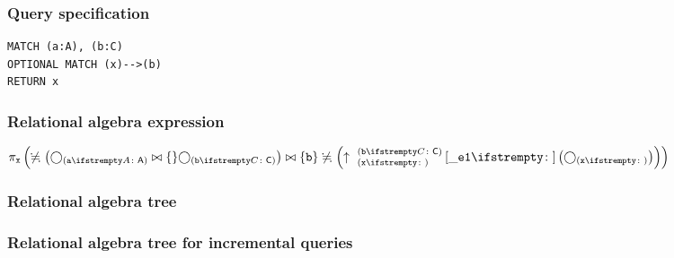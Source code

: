 \subsubsection*{Query specification}

\begin{lstlisting}
MATCH (a:A), (b:C)
OPTIONAL MATCH (x)-->(b)
RETURN x
\end{lstlisting}

\subsubsection*{Relational algebra expression}

$\projection{\var{x}} \left(\alldifferent{} \left(\getvertices{a}{A} \join \{\} \getvertices{b}{C}\right) \join \{\var{b}\} \alldifferent{} \left(\expandout{x}{b}{C}{\_e1}{} \left(\getvertices{x}{}\right)\right)\right)$

\subsubsection*{Relational algebra tree}


\subsubsection*{Relational algebra tree for incremental queries}

